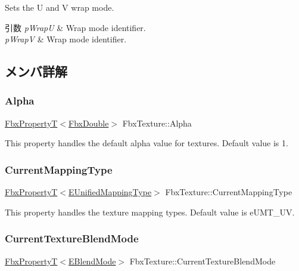 Sets the U and V wrap mode. 
\begin{DoxyParams}{引数}
{\em p\+WrapU} & Wrap mode identifier. \\
\hline
{\em p\+WrapV} & Wrap mode identifier. \\
\hline
\end{DoxyParams}


\subsection{メンバ詳解}
\mbox{\label{class_fbx_texture_a7248e3e31a2739d23c46a1c1a60fd801}} 
\subsubsection{\texorpdfstring{Alpha}{Alpha}}
{\footnotesize\ttfamily \hyperlink{class_fbx_property_t}{Fbx\+PropertyT}$<$\hyperlink{fbxtypes_8h_a171e72a1c46fc15c1a6c9c31948c1c5b}{Fbx\+Double}$>$ Fbx\+Texture\+::\+Alpha}

This property handles the default alpha value for textures. Default value is 1. \mbox{\label{class_fbx_texture_a128209af76f914e38438ba56879c0d5c}} 
\subsubsection{\texorpdfstring{Current\+Mapping\+Type}{CurrentMappingType}}
{\footnotesize\ttfamily \hyperlink{class_fbx_property_t}{Fbx\+PropertyT}$<$\hyperlink{class_fbx_texture_a66649699e6cdfe32a40284ed8e1faad3}{E\+Unified\+Mapping\+Type}$>$ Fbx\+Texture\+::\+Current\+Mapping\+Type}

This property handles the texture mapping types. Default value is e\+U\+M\+T\+\_\+\+UV. \mbox{\label{class_fbx_texture_a0f0cad13b8b10cfbeb31801b503a60ec}} 
\subsubsection{\texorpdfstring{Current\+Texture\+Blend\+Mode}{CurrentTextureBlendMode}}
{\footnotesize\ttfamily \hyperlink{class_fbx_property_t}{Fbx\+PropertyT}$<$\hyperlink{class_fbx_texture_af1e8597086589ba6b8ba0066d47b6b63}{E\+Blend\+Mode}$>$ Fbx\+Texture\+::\+Current\+Texture\+Blend\+Mode}


